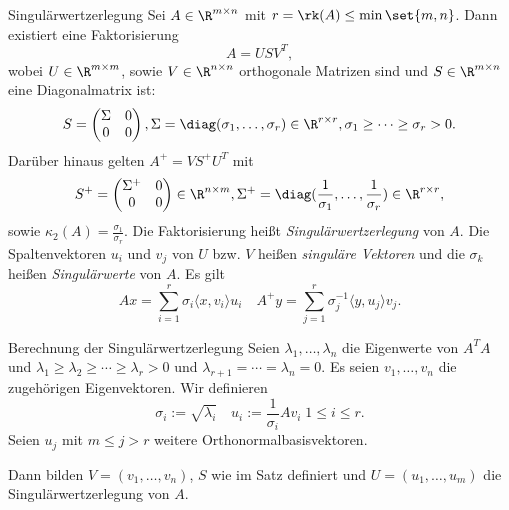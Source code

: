 \begin{karte}{Singulärwertzerlegung}
    Sei \( A \in \R^{m\times n} \) mit \(r = \rk(A) \leq \min\set{m,n}\). Dann existiert 
    eine Faktorisierung 
    \[ A = USV^T, \]
    wobei \( U \in \R^{m\times m} \), sowie \( V \in \R^{n\times n} \) orthogonale Matrizen 
    sind und \( S \in \R^{m\times n} \) eine Diagonalmatrix ist: 
    \[ S = \begin{pmatrix}
        \Sigma & 0 \\ 0 & 0
    \end{pmatrix}, \Sigma = \diag(\sigma_1, \ldots, \sigma_r) \in \R^{r\times r}, 
    \sigma_1 \geq \cdots \geq \sigma_r > 0. \]
    Darüber hinaus gelten \( A^+ = V S^+ U^T \) mit 
    \[ S^+ = \begin{pmatrix}
        \Sigma^+ & 0 \\ 0 & 0
    \end{pmatrix} \in \R^{n\times m}, \Sigma^+ = \diag(\frac{1}{\sigma_1}, \ldots, \frac{1}{\sigma_r}) \in \R^{r\times r}, \]
    sowie \( \kappa_2(A) = \frac{\sigma_1}{\sigma_r} \). Die Faktorisierung heißt 
    \textit{Singulärwertzerlegung} von \(A\). Die Spaltenvektoren \( u_i \) und \(v_j\)
    von \(U\) bzw. \(V\) heißen \textit{singuläre Vektoren} und die \( \sigma_k \) heißen 
    \textit{Singulärwerte} von \(A\). Es gilt 
    \[ Ax = \sum_{i=1}^r \sigma_i \langle x, v_i\rangle u_i \quad 
    A^+y = \sum_{j=1}^r \sigma_j^{-1}\langle y, u_j \rangle v_j. \]
\end{karte}

\begin{karte}{Berechnung der Singulärwertzerlegung}
    Seien \( \lambda_1, \ldots, \lambda_n \) die Eigenwerte von \( A^T A \)
    und \( \lambda_1 \geq \lambda_2 \geq \cdots \geq \lambda_r > 0 \) und 
    \( \lambda_{r+1} = \cdots = \lambda_n = 0 \). Es seien \( v_1,\ldots, v_n \) 
    die zugehörigen Eigenvektoren. Wir definieren 
    \[ \sigma_i := \sqrt{\lambda_i} \quad u_i := \frac{1}{\sigma_i} A v_i \;1\leq i \leq r. \]
    Seien \( u_j \) mit \( m \leq j > r \) weitere Orthonormalbasisvektoren.

    Dann bilden \( V = (v_1, \ldots, v_n) \), \(S\) wie im Satz definiert 
    und \( U = (u_1, \ldots, u_m) \) die Singulärwertzerlegung von \(A\).
\end{karte}